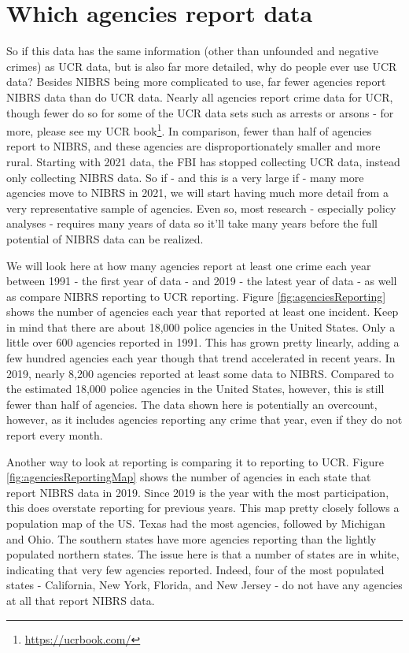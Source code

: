 \documentclass[
]{krantz}
\renewcommand{\href}[2]{#2\footnote{\url{#1}}}
\begin{document}
\section{Which agencies report
data}\label{which-agencies-report-data}

So if this data has the same information (other than
unfounded and negative crimes) as UCR data, but is also far
more detailed, why do people ever use UCR data? Besides
NIBRS being more complicated to use, far fewer agencies
report NIBRS data than do UCR data. Nearly all agencies
report crime data for UCR, though fewer do so for some of
the UCR data sets such as arrests or arsons - for more,
please see my \href{https://ucrbook.com/}{UCR book}. In
comparison, fewer than half of agencies report to NIBRS, and
these agencies are disproportionately smaller and more
rural. Starting with 2021 data, the FBI has stopped
collecting UCR data, instead only collecting NIBRS data. So
if - and this is a very large if - many more agencies move
to NIBRS in 2021, we will start having much more detail from
a very representative sample of agencies. Even so, most
research - especially policy analyses - requires many years
of data so it'll take many years before the full potential
of NIBRS data can be realized.

We will look here at how many agencies report at least one
crime each year between 1991 - the first year of data - and
2019 - the latest year of data - as well as compare NIBRS
reporting to UCR reporting. Figure
\ref{fig:agenciesReporting} shows the number of agencies
each year that reported at least one incident. Keep in mind
that there are about 18,000 police agencies in the United
States. Only a little over 600 agencies reported in 1991.
This has grown pretty linearly, adding a few hundred
agencies each year though that trend accelerated in recent
years. In 2019, nearly 8,200 agencies reported at least some
data to NIBRS. Compared to the estimated 18,000 police
agencies in the United States, however, this is still fewer
than half of agencies. The data shown here is potentially an
overcount, however, as it includes agencies reporting any
crime that year, even if they do not report every month.

Another way to look at reporting is comparing it to
reporting to UCR. Figure \ref{fig:agenciesReportingMap}
shows the number of agencies in each state that report NIBRS
data in 2019. Since 2019 is the year with the most
participation, this does overstate reporting for previous
years. This map pretty closely follows a population map of
the US. Texas had the most agencies, followed by Michigan
and Ohio. The southern states have more agencies reporting
than the lightly populated northern states. The issue here
is that a number of states are in white, indicating that
very few agencies reported. Indeed, four of the most
populated states - California, New York, Florida, and New
Jersey - do not have any agencies at all that report NIBRS
data.
\end{document}
